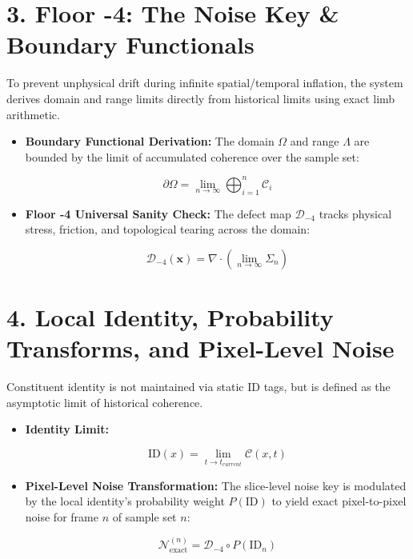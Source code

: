 \medskip

\section{\texorpdfstring{3. Floor -4: The Noise Key \& Boundary Functionals}{3. Floor -4: The Noise Key \& Boundary Functionals}}

To prevent unphysical drift during infinite spatial/temporal inflation, the system derives domain and range limits directly from historical limits using exact limb arithmetic.

\begin{itemize}
\item \textbf{Boundary Functional Derivation:} The domain \(\Omega\) and range \(\Lambda\) are bounded by the limit of accumulated coherence over the sample set:

\[
\partial \Omega = \lim_{n \to \infty} \bigoplus_{i=1}^n \mathcal{C}_i
\]
\item \textbf{Floor -4 Universal Sanity Check:} The defect map \(\mathcal{D}_{-4}\) tracks physical stress, friction, and topological tearing across the domain:

\[
\mathcal{D}_{-4}(\mathbf{x}) = \nabla \cdot \left( \lim_{n \to \infty} \Sigma_n \right)
\]
\end{itemize}

\medskip

\section{\texorpdfstring{4. Local Identity, Probability Transforms, and Pixel-Level Noise}{4. Local Identity, Probability Transforms, and Pixel-Level Noise}}

Constituent identity is not maintained via static ID tags, but is defined as the asymptotic limit of historical coherence.

\begin{itemize}
\item \textbf{Identity Limit:}

\[
\text{ID}(x) = \lim_{t \to t_{current}} \mathcal{C}(x, t)
\]
\item \textbf{Pixel-Level Noise Transformation:} The slice-level noise key is modulated by the local identity's probability weight \(P(\text{ID})\) to yield exact pixel-to-pixel noise for frame \(n\) of sample set \(n\):

\[
\mathcal{N}_{\text{exact}}^{(n)} = \mathcal{D}_{-4} \circ P(\text{ID}_n)
\]
\end{itemize}

